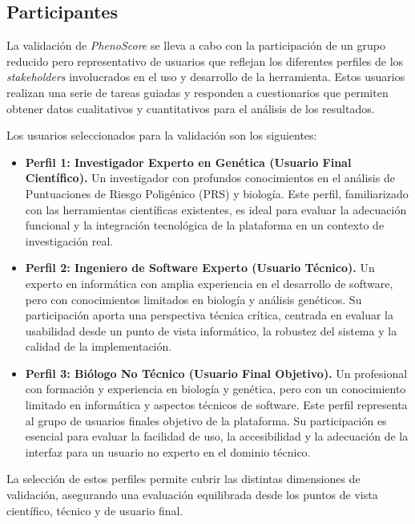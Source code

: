 \subsection{Participantes}

La validación de \textit{PhenoScore} se lleva a cabo con la participación de un grupo reducido pero representativo de usuarios que reflejan los diferentes perfiles de los \textit{stakeholders} involucrados en el uso y desarrollo de la herramienta. Estos usuarios realizan una serie de tareas guiadas y responden a cuestionarios que permiten obtener datos cualitativos y cuantitativos para el análisis de los resultados.

Los usuarios seleccionados para la validación son los siguientes:

\begin{itemize}
    \item \textbf{Perfil 1: Investigador Experto en Genética (Usuario Final Científico).} Un investigador con profundos conocimientos en el análisis de Puntuaciones de Riesgo Poligénico (PRS) y biología. Este perfil, familiarizado con las herramientas científicas existentes, es ideal para evaluar la adecuación funcional y la integración tecnológica de la plataforma en un contexto de investigación real.
    
    \item \textbf{Perfil 2: Ingeniero de Software Experto (Usuario Técnico).} Un experto en informática con amplia experiencia en el desarrollo de software, pero con conocimientos limitados en biología y análisis genéticos. Su participación aporta una perspectiva técnica crítica, centrada en evaluar la usabilidad desde un punto de vista informático, la robustez del sistema y la calidad de la implementación.

    \item \textbf{Perfil 3: Biólogo No Técnico (Usuario Final Objetivo).} Un profesional con formación y experiencia en biología y genética, pero con un conocimiento limitado en informática y aspectos técnicos de software. Este perfil representa al grupo de usuarios finales objetivo de la plataforma. Su participación es esencial para evaluar la facilidad de uso, la accesibilidad y la adecuación de la interfaz para un usuario no experto en el dominio técnico.

\end{itemize}

La selección de estos perfiles permite cubrir las distintas dimensiones de validación, asegurando una evaluación equilibrada desde los puntos de vista científico, técnico y de usuario final.

